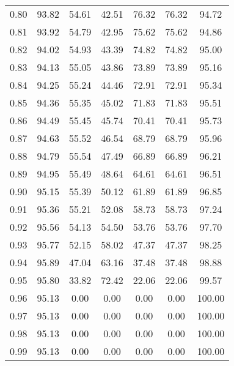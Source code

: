 \begin{tabular}{|c|c|c|c|c|c|c|}
      0.80 &     93.82 &     54.61 &      42.51 &   76.32 &      76.32 &         94.72 \\
      0.81 &     93.92 &     54.79 &      42.95 &   75.62 &      75.62 &         94.86 \\
      0.82 &     94.02 &     54.93 &      43.39 &   74.82 &      74.82 &         95.00 \\
      0.83 &     94.13 &     55.05 &      43.86 &   73.89 &      73.89 &         95.16 \\
      0.84 &     94.25 &     55.24 &      44.46 &   72.91 &      72.91 &         95.34 \\
      0.85 &     94.36 &     55.35 &      45.02 &   71.83 &      71.83 &         95.51 \\
      0.86 &     94.49 &     55.45 &      45.74 &   70.41 &      70.41 &         95.73 \\
      0.87 &     94.63 &     55.52 &      46.54 &   68.79 &      68.79 &         95.96 \\
      0.88 &     94.79 &     55.54 &      47.49 &   66.89 &      66.89 &         96.21 \\
      0.89 &     94.95 &     55.49 &      48.64 &   64.61 &      64.61 &         96.51 \\
      0.90 &     95.15 &     55.39 &      50.12 &   61.89 &      61.89 &         96.85 \\
      0.91 &     95.36 &     55.21 &      52.08 &   58.73 &      58.73 &         97.24 \\
      0.92 &     95.56 &     54.13 &      54.50 &   53.76 &      53.76 &         97.70 \\
      0.93 &     95.77 &     52.15 &      58.02 &   47.37 &      47.37 &         98.25 \\
      0.94 &     95.89 &     47.04 &      63.16 &   37.48 &      37.48 &         98.88 \\
      0.95 &     95.80 &     33.82 &      72.42 &   22.06 &      22.06 &         99.57 \\
      0.96 &     95.13 &      0.00 &       0.00 &    0.00 &       0.00 &        100.00 \\
      0.97 &     95.13 &      0.00 &       0.00 &    0.00 &       0.00 &        100.00 \\
      0.98 &     95.13 &      0.00 &       0.00 &    0.00 &       0.00 &        100.00 \\
      0.99 &     95.13 &      0.00 &       0.00 &    0.00 &       0.00 &        100.00 \\
\bottomrule
\end{tabular}
